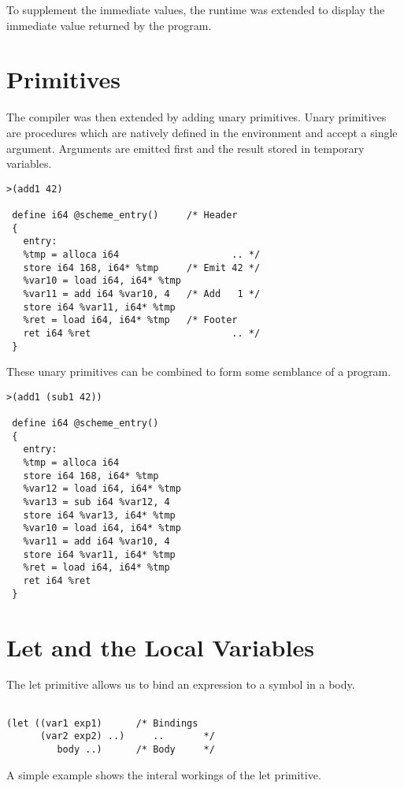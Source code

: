 \documentclass{article}
\begin{document}
To supplement the immediate values, the runtime was extended to display the immediate value returned by the program. 

\section{Primitives}

The compiler was then extended by adding unary primitives. Unary primitives are procedures which are natively defined in the environment and accept a single argument. Arguments are emitted first and the result stored in temporary variables. 

\begin{verbatim}
>(add1 42)

 define i64 @scheme_entry()     /* Header
 {
   entry:
   %tmp = alloca i64                    .. */
   store i64 168, i64* %tmp     /* Emit 42 */ 
   %var10 = load i64, i64* %tmp 
   %var11 = add i64 %var10, 4   /* Add   1 */
   store i64 %var11, i64* %tmp  
   %ret = load i64, i64* %tmp   /* Footer 
   ret i64 %ret                         .. */
 }
\end{verbatim}

These unary primitives can be combined to form some semblance of a program.

\begin{verbatim}
>(add1 (sub1 42))

 define i64 @scheme_entry()
 {
   entry: 
   %tmp = alloca i64
   store i64 168, i64* %tmp
   %var12 = load i64, i64* %tmp
   %var13 = sub i64 %var12, 4
   store i64 %var13, i64* %tmp
   %var10 = load i64, i64* %tmp
   %var11 = add i64 %var10, 4
   store i64 %var11, i64* %tmp
   %ret = load i64, i64* %tmp
   ret i64 %ret
 }
\end{verbatim}


\section{Let and the Local Variables}

The let primitive allows us to bind an expression to a symbol in a body. 

\begin{verbatim}

(let ((var1 exp1)      /* Bindings
      (var2 exp2) ..)     ..       */
         body ..)      /* Body     */   

\end{verbatim}

A simple example shows the interal workings of the let primitive.
\end{document}
